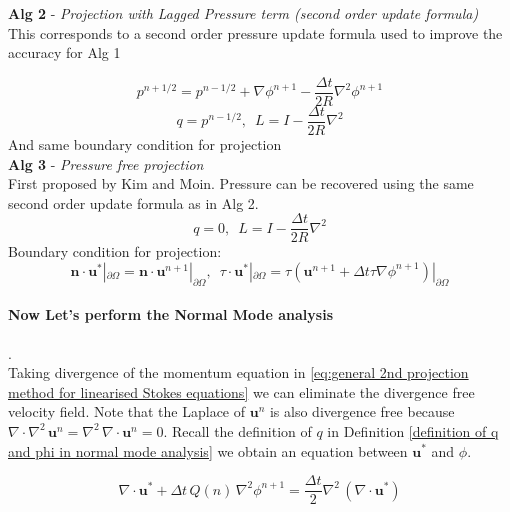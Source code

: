 \textbf{Alg 2} - \emph{Projection with Lagged Pressure term (second order update formula)}\\
This corresponds to a second order pressure update formula used to improve the accuracy for Alg 1

\begin{equation*}
p^{n+1/2} = p^{n-1/2} + \nabla \phi^{n+1} - \dfrac{\Delta t}{2 R} \nabla^2 \phi^{n+1}
\end{equation*}
\begin{equation*}
q = p^{n-1/2}, \, \, \, L = I - \dfrac{\Delta t}{2 R} \nabla^2
\end{equation*}
And same boundary condition for projection\\

\textbf{Alg 3} - \emph{Pressure free projection}\\
First proposed by Kim and Moin. Pressure can be recovered using the same second order update formula as in Alg 2. \cite{kim1985application,brown2001accurate}
\begin{equation*}
q = 0, \, \, \, L = I - \dfrac{\Delta t}{2 R} \nabla^2
\end{equation*}
Boundary condition for projection:
\begin{equation*}
\textbf{n} \cdot \textbf{u}^* |_{\partial \Omega} = \textbf{n} \cdot \textbf{u}^{n+1} |_{\partial \Omega}, \, \, \, \textbf{$\tau$} \cdot \textbf{u}^* |_{\partial \Omega} = \textbf{$\tau$} \left(\textbf{u}^{n+1}+ \Delta t \textbf{$\tau$} \nabla \phi^{n+1}\right) |_{\partial \Omega}
\end{equation*}

\paragraph*{Now Let's perform the Normal Mode analysis}.\\
Taking divergence of the momentum equation in \eqref{eq:general 2nd projection method for linearised Stokes equations} we can eliminate the divergence free velocity field. Note that the Laplace of $\textbf{u}^n$ is also divergence free because $\nabla \cdot \nabla^2 \,\textbf{u}^n = \nabla^2 \,\nabla \cdot \textbf{u}^n = 0$. Recall the definition of $q$ in Definition \ref{definition of q and phi in normal mode analysis} we obtain an equation between $\textbf{u}^*$ and $\phi$.

\begin{equation}
\nabla \cdot \textbf{u}^* + \Delta t \,Q(n)\,\nabla^2 \phi^{n+1} = \dfrac{\Delta t}{2} \nabla^2 \,(\nabla \cdot \textbf{u}^*)
\end{equation}

